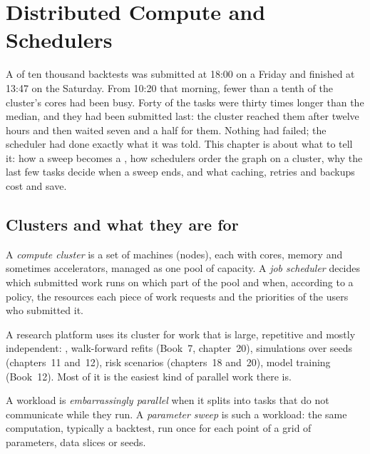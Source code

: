 \chapter{Distributed Compute and Schedulers}\label{ch:pl:distributed-compute-and-schedulers}

A  of ten thousand backtests was submitted at 18:00 on a Friday and finished at 13:47 on the Saturday. From 10:20 that morning,
fewer than a tenth of the cluster's cores had been busy. Forty of the tasks were thirty times longer than the median, and they had
been submitted last: the cluster reached them after twelve hours and then waited seven and a half for them. Nothing had failed; the scheduler had done
exactly what it was told. This chapter is about what to tell it: how a sweep becomes a , how schedulers order the graph on a
cluster, why the last few tasks decide when a sweep ends, and what caching, retries and backups cost and save.

\section{Clusters and what they are for}

\begin{definition}\label{def:pl:distributed-compute-and-schedulers:cluster}
A \emph{compute cluster} is a set of machines (nodes), each with cores, memory and sometimes accelerators, managed
as one pool of capacity. A \emph{job scheduler} decides which submitted work runs on which part of the pool and when,
according to a policy, the resources each piece of work requests and the priorities of the users who submitted it.
\end{definition}

A research platform uses its cluster for work that is large, repetitive and mostly independent: , walk-forward refits
(Book~7, chapter~20), simulations over seeds (chapters~11 and~12), risk scenarios (chapters~18 and~20), model training (Book~12). Most of it
is the easiest kind of parallel work there is.

\begin{definition}\label{def:pl:distributed-compute-and-schedulers:sweep}
A workload is \emph{embarrassingly parallel} when it splits into tasks that do not communicate
while they run. A \emph{parameter sweep} is such a workload: the same computation, typically a backtest, run once
for each point of a grid of parameters, data slices or seeds.
\end{definition}

